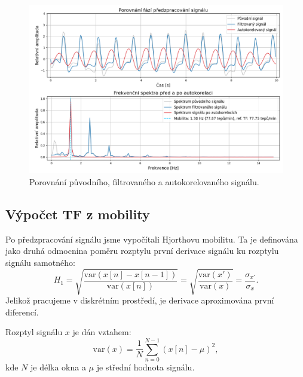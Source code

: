 \begin{figure}[!th]
	\centering
	\includegraphics[width=1\textwidth]{./obrazky/hjorth_preprocess.png}
	\caption[Porovnání původního, filtrovaného a autokorelovaného signálu]{Porovnání původního, filtrovaného a autokorelovaného signálu.}
	\label{fig:hjorth_predzpracovani}
\end{figure}

\subsection*{Výpočet TF z mobility}
\label{sec:TF_mobilita}
Po předzpracování signálu jsme vypočítali Hjorthovu mobilitu.
Ta je definována~\cite{Hjorth1970,Geetika2022} jako druhá odmocnina poměru rozptylu první derivace signálu ku rozptylu signálu samotného:
\begin{equation}
	\label{eq:hjorth_mobility}
	H_1 = \sqrt{ \frac{ \mathrm{var}(x[n] - x[n-1]) }{ \mathrm{var}(x[n]) } }
	= \sqrt{ \frac{ \mathrm{var}(x') }{ \mathrm{var}(x) } }
	= \frac{ \sigma_{x'} }{ \sigma_{x} }.
\end{equation}
Jelikož pracujeme v diskrétním prostředí, je derivace aproximována první diferencí.

Rozptyl signálu \( x \) je dán vztahem:
\begin{equation}
	\label{eq:hjorth_var_signal}
	\mathrm{var}(x) = \frac{1}{N} \sum_{n=0}^{N-1} (x[n] - \mu)^2,
\end{equation}
kde \( N \) je délka okna a \( \mu \) je střední hodnota signálu.

